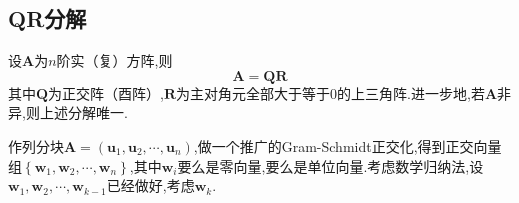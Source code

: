 \subsection{QR分解}
\begin{formal}
    \begin{theorem}[QR分解]\label{thm:QR分解}
        设$\bm{A}$为$n$阶实（复）方阵,则\[
        \bm{A}=\bm{QR}
        \]其中$\bm{Q}$为正交阵（酉阵）,$\bm{R}$为主对角元全部大于等于$0$的上三角阵.进一步地,若$\bm{A}$非异,则上述分解唯一.
    \end{theorem}\newpage
    \begin{Proof}
        作列分块$\bm{A}=\left(\bm{u}_1,\bm{u}_2,\cdots,\bm{u}_n\right)$,做一个推广的\textup{Gram-Schmidt}正交化,得到正交向量组$\left\{
            \bm{w}_1,\bm{w}_2,\cdots,\bm{w}_n
        \right\}$,其中$\bm{w}_i$要么是零向量,要么是单位向量.考虑数学归纳法,设$\bm{w}_1,\bm{w}_2,\cdots,\bm{w}_{k-1}$已经做好,考虑$\bm{w}_k.$


\end{Proof}
\end{formal}
